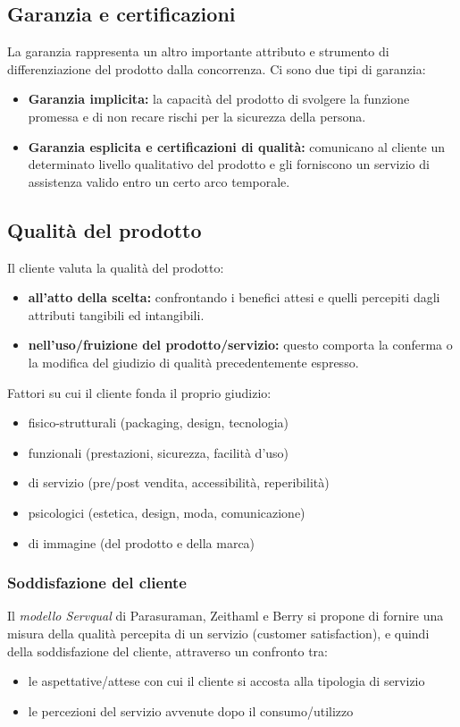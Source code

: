 \subsection{Garanzia e certificazioni}
La garanzia rappresenta un altro importante attributo e strumento di differenziazione del
prodotto dalla concorrenza. Ci sono due tipi di garanzia:
\begin{itemize}
	\item \textbf{Garanzia implicita:} la capacità del prodotto di svolgere la funzione promessa e di non recare rischi per la sicurezza della persona.
	\item \textbf{Garanzia esplicita e certificazioni di qualità:} comunicano al cliente un determinato livello qualitativo del prodotto e gli forniscono un servizio di assistenza valido entro un certo arco temporale.
\end{itemize}

\subsection{Qualità del prodotto}
Il cliente valuta la qualità del prodotto:
\begin{itemize}
	\item \textbf{all’atto della scelta:} confrontando i benefici attesi e quelli percepiti dagli attributi tangibili ed intangibili.
	\item \textbf{nell’uso/fruizione del prodotto/servizio:} questo comporta la conferma o la modifica del giudizio di	qualità precedentemente espresso.
\end{itemize}
Fattori su cui il cliente fonda il proprio giudizio:
\begin{itemize}
	\item fisico-strutturali (packaging, design, tecnologia)
	\item funzionali (prestazioni, sicurezza, facilità d’uso)
	\item di servizio (pre/post vendita, accessibilità, reperibilità)
	\item psicologici (estetica, design, moda, comunicazione)
	\item di immagine (del prodotto e della marca)
\end{itemize}

\subsubsection{Soddisfazione del cliente}
Il \textit{modello Servqual} di Parasuraman, Zeithaml e Berry si propone di fornire una misura della qualità percepita di un servizio (customer satisfaction), e quindi della
soddisfazione del cliente, attraverso un confronto tra:
\begin{itemize}
	\item le aspettative/attese con cui il cliente si accosta alla tipologia di
	servizio
	\item le percezioni del servizio avvenute dopo il consumo/utilizzo
\end{itemize}


